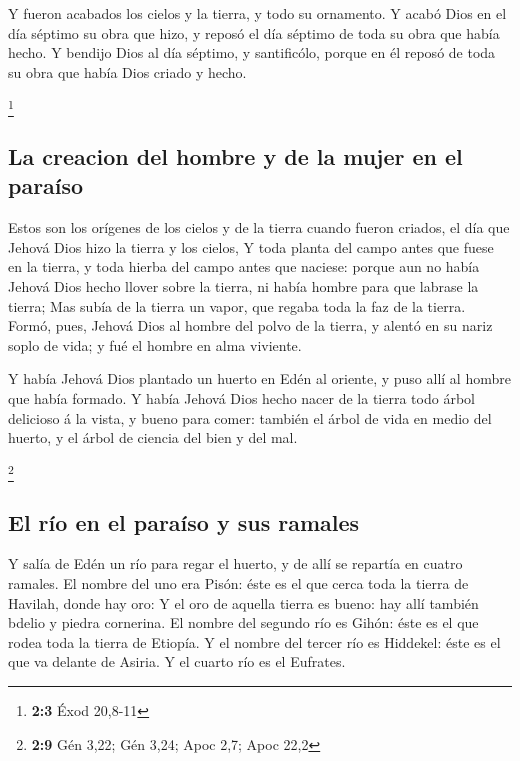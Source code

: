  Y fueron acabados los cielos y la tierra, y todo su
ornamento.  Y acabó Dios en el día séptimo su obra que hizo,
y reposó el día séptimo de toda su obra que había hecho.  Y
bendijo Dios al día séptimo, y santificólo, porque en él reposó de toda
su obra que había Dios criado y hecho.

\footnote{\textbf{2:3} Éxod 20,8-11}

\hypertarget{la-creacion-del-hombre-y-de-la-mujer-en-el-parauxedso}{%
\subsection{La creacion del hombre y de la mujer en el
paraíso}\label{la-creacion-del-hombre-y-de-la-mujer-en-el-parauxedso}}

 Estos son los orígenes de los cielos y de la tierra cuando
fueron criados, el día que Jehová Dios hizo la tierra y los cielos,
 Y toda planta del campo antes que fuese en la tierra, y
toda hierba del campo antes que naciese: porque aun no había Jehová Dios
hecho llover sobre la tierra, ni había hombre para que labrase la
tierra;  Mas subía de la tierra un vapor, que regaba toda la
faz de la tierra.  Formó, pues, Jehová Dios al hombre del
polvo de la tierra, y alentó en su nariz soplo de vida; y fué el hombre
en alma viviente.

 Y había Jehová Dios plantado un huerto en Edén al oriente,
y puso allí al hombre que había formado.  Y había Jehová
Dios hecho nacer de la tierra todo árbol delicioso á la vista, y bueno
para comer: también el árbol de vida en medio del huerto, y el árbol de
ciencia del bien y del mal.

\footnote{\textbf{2:9} Gén 3,22; Gén 3,24; Apoc 2,7; Apoc 22,2}

\hypertarget{el-ruxedo-en-el-parauxedso-y-sus-ramales}{%
\subsection{El río en el paraíso y sus
ramales}\label{el-ruxedo-en-el-parauxedso-y-sus-ramales}}

 Y salía de Edén un río para regar el huerto, y de allí se
repartía en cuatro ramales.  El nombre del uno era Pisón:
éste es el que cerca toda la tierra de Havilah, donde hay oro:
 Y el oro de aquella tierra es bueno: hay allí también
bdelio y piedra cornerina.  El nombre del segundo río es
Gihón: éste es el que rodea toda la tierra de Etiopía.  Y
el nombre del tercer río es Hiddekel: éste es el que va delante de
Asiria. Y el cuarto río es el Eufrates.

